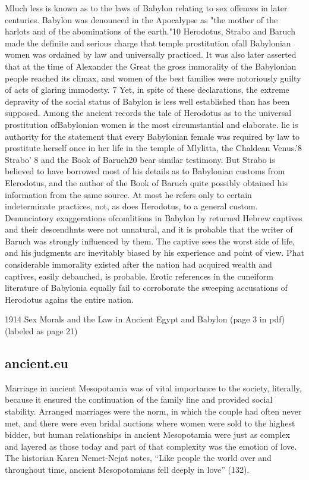 \documentclass[11pt]{article}
\begin{document}
{Mluch less is known as to the laws of Babylon relating to sex offences in later centuries. Babylon was denounced in the Apocalypse as
"the mother of the harlots and of the abominations of the earth."10
Herodotus, Strabo and Baruch made the definite and serious charge that
temple prostitution ofall Babylonian women was ordained by law and
universally practiced. It was also later asserted that at the time of
Alexander the Great the gross immorality of the Babylonian people
reached its climax, and women of the best families were notoriously
guilty of acts of glaring immodesty. 7 Yet, in spite of these declarations, the extreme depravity of the social status of Babylon is less well
established than has been supposed. Among the ancient records the
tale of Herodotus as to the universal prostitution ofBabylonian women
is the most circumstantial and elaborate. lie is authority for the statement that every Babylonian female was required by law to prostitute
herself once in her life in the temple of Mlylitta, the Chaldean Venus.'8
Strabo' 8 and the Book of Baruch20 bear similar testimony. But Strabo
is believed to have borrowed most of his details as to Babylonian customs from Elerodotus, and the author of the Book of Baruch quite possibly
obtained his information from the same source. At most he refers
only to certain indeterminate practices, not, as does Herodotus, to a general custom. Denunciatory exaggerations ofconditions in Babylon by
returned Hebrew captives and their descendhnts were not unnatural,
and it is probable that the writer of Baruch was strongly influenced by
them. The captive sees the worst side of life, and his judgments arc
inevitably biased by his experience and point of view. Phat considerable
immorality existed after the nation had acquired wealth and captives,
easily debauched, is probable. Erotic references in the cuneiform literature of Babylonia equally fail to corroborate the sweeping accusations
of Herodotus agains the entire nation.


1914
Sex Morals and the Law in Ancient Egypt and
Babylon (page 3 in pdf) (labeled as page 21)




\subsection{ancient.eu}
Marriage in ancient Mesopotamia was of vital importance to the society, literally, because it ensured the continuation of the family line and provided social stability. Arranged marriages were the norm, in which the couple had often never met, and there were even bridal auctions where women were sold to the highest bidder, but human relationships in ancient Mesopotamia were just as complex and layered as those today and part of that complexity was the emotion of love. The historian Karen Nemet-Nejat notes, “Like people the world over and throughout time, ancient Mesopotamians fell deeply in love” (132).


}
\end{document}
